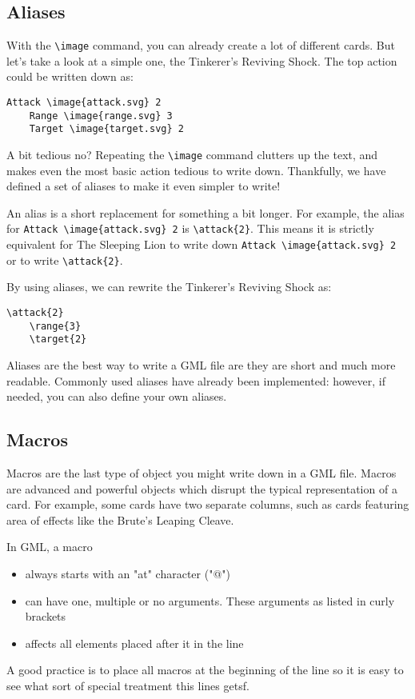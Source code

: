 \documentclass{article}
\begin{document}
\subsection{Aliases}
With the \verb#\image# command, you can already create a lot of different cards. But let's take a look at a simple one, the Tinkerer's Reviving Shock. The top action could be written down as:
\begin{center}
\begin{BVerbatim}
Attack \image{attack.svg} 2
    Range \image{range.svg} 3
    Target \image{target.svg} 2
\end{BVerbatim}
\end{center}

A bit tedious no? Repeating the \verb#\image# command clutters up the text, and makes even the most basic action tedious to write down. Thankfully, we have defined a set of aliases to make it even simpler to write!

An alias is a short replacement for something a bit longer. For example, the alias for \verb#Attack \image{attack.svg} 2# is \verb#\attack{2}#. This means it is strictly equivalent for The Sleeping Lion to write down \verb#Attack \image{attack.svg} 2# or to write \verb#\attack{2}#.

By using aliases, we can rewrite the Tinkerer's Reviving Shock as:
\begin{center}
\begin{BVerbatim}
\attack{2}
    \range{3}
    \target{2}
\end{BVerbatim}
\end{center}


Aliases are the best way to write a GML file are they are short and much more readable. Commonly used aliases have already been implemented: however, if needed, you can also define your own aliases.

\subsection{Macros}
Macros are the last type of object you might write down in a GML file. Macros are advanced and powerful objects which disrupt the typical representation of a card. For example, some cards have two separate columns, such as cards featuring area of effects like the Brute's Leaping Cleave.

In GML, a macro
\begin{itemize}
	\item always starts with an "at" character ("@")
	\item can have one, multiple or no arguments. These arguments as listed in curly brackets
	\item affects all elements placed after it in the line

\end{itemize}
A good practice is to place all macros at the beginning of the line so it is easy to see what sort of special treatment this lines getsf.
\end{document}
